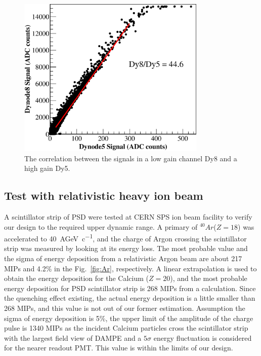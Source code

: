 \documentclass[5p, times]{elsarticle}
\begin{document}
\begin{figure}
 \centering
 \includegraphics[width=90mm]{dy58}
\caption{The correlation between the signals in a low gain channel Dy8 and a high gain Dy5.}
\label{fig:dy58}
\end{figure} 

\subsection{Test with relativistic heavy ion beam}
\label{sec:beam}

A scintillator strip of PSD were tested at CERN SPS ion beam facility to verify our design to the required upper dynamic range. 
A primary of $^{40}Ar$($Z=18$) was accelerated to \SI{40}{AGeV\per c}, and the charge of Argon crossing the scintillator strip was measured by looking at its energy loss. 
The most probable value and the sigma of energy deposition from a relativistic Argon beam are about 217 MIPs and 4.2\% in the Fig.~\ref{fig:Ar}, respectively. 
A linear extrapolation is used to obtain the energy deposition for the Calcium ($Z=20$), and the most probable energy deposition for PSD scintillator strip is 268 MIPs from a calculation. 
Since the quenching effect existing, the actual energy deposition is a little smaller than 268 MIPs, and this value is not out of our former estimation. 
Assumption the sigma of energy deposition is 5\%, the upper limit of the amplitude of the charge pulse is 1340 MIPs as the incident Calcium particles cross the scintillator strip with the largest field view of DAMPE and a $5\sigma$ energy fluctuation is considered for the nearer readout PMT. 
This value is within the limits of our design.
\end{document}
